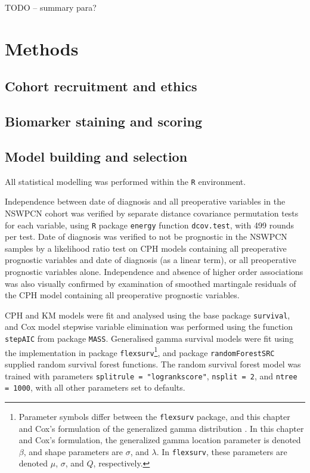 \documentclass[dissertation.tex]{subfiles}
\begin{document}
TODO -- summary para?

\section{Methods}
\subsection{Cohort recruitment and ethics}
\label{subsec:nomo-methods-cohort}

\subsection{Biomarker staining and scoring}

\subsection{Model building and selection}
All statistical modelling was performed within the \texttt{R} environment.

Independence between date of diagnosis and all preoperative variables in the \gls{NSWPCN} cohort was verified by separate distance covariance \cite{Szekely2013} permutation tests for each variable, using \texttt{R} package \texttt{energy} function \texttt{dcov.test}, with 499 rounds per test.  Date of diagnosis was verified to not be prognostic in the \gls{NSWPCN} samples by a likelihood ratio test on \gls{CPH} models containing all preoperative prognostic variables and date of diagnosis (as a linear term), or all preoperative prognostic variables alone.  Independence and absence of higher order associations was also visually confirmed by examination of smoothed martingale residuals of the \gls{CPH} model containing all preoperative prognostic variables.

\gls{CPH} and \gls{KM} models were fit and analysed using the base package \texttt{survival}, and Cox model stepwise variable elimination was performed using the function \texttt{stepAIC} from package \texttt{MASS}.  Generalised gamma survival models were fit using the implementation in package \texttt{flexsurv}\footnote{Parameter symbols differ between the \texttt{flexsurv} package, and this chapter and Cox's formulation of the generalized gamma distribution \cite{Cox2007}.  In this chapter and Cox's formulation, the generalized gamma location parameter is denoted $\beta$, and shape parameters are $\sigma$, and $\lambda$.  In \texttt{flexsurv}, these parameters are denoted $\mu$, $\sigma$, and $Q$, respectively.}, and package \texttt{randomForestSRC} supplied random survival forest functions.  The random survival forest model was trained with parameters \texttt{splitrule = "logrankscore"}, \texttt{nsplit = 2}, and \texttt{ntree = 1000}, with all other parameters set to defaults.
\end{document}

